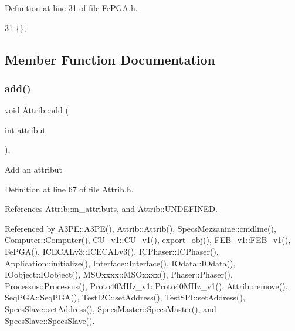 Definition at line 31 of file Fe\+P\+G\+A.\+h.


\begin{DoxyCode}
31 \{\}; 
\end{DoxyCode}


\subsection{Member Function Documentation}
\mbox{\label{classAttrib_a235f773af19c900264a190b00a3b4ad7}} 
\subsubsection{\texorpdfstring{add()}{add()}}
{\footnotesize\ttfamily void Attrib\+::add (\begin{DoxyParamCaption}\item[{int}]{attribut }\end{DoxyParamCaption})\hspace{0.3cm}{\ttfamily [inline]}, {\ttfamily [inherited]}}

Add an attribut 

Definition at line 67 of file Attrib.\+h.



References Attrib\+::m\+\_\+attributs, and Attrib\+::\+U\+N\+D\+E\+F\+I\+N\+ED.



Referenced by A3\+P\+E\+::\+A3\+P\+E(), Attrib\+::\+Attrib(), Specs\+Mezzanine\+::cmdline(), Computer\+::\+Computer(), C\+U\+\_\+v1\+::\+C\+U\+\_\+v1(), export\+\_\+obj(), F\+E\+B\+\_\+v1\+::\+F\+E\+B\+\_\+v1(), Fe\+P\+G\+A(), I\+C\+E\+C\+A\+Lv3\+::\+I\+C\+E\+C\+A\+Lv3(), I\+C\+Phaser\+::\+I\+C\+Phaser(), Application\+::initialize(), Interface\+::\+Interface(), I\+Odata\+::\+I\+Odata(), I\+Oobject\+::\+I\+Oobject(), M\+S\+Oxxxx\+::\+M\+S\+Oxxxx(), Phaser\+::\+Phaser(), Processus\+::\+Processus(), Proto40\+M\+Hz\+\_\+v1\+::\+Proto40\+M\+Hz\+\_\+v1(), Attrib\+::remove(), Seq\+P\+G\+A\+::\+Seq\+P\+G\+A(), Test\+I2\+C\+::set\+Address(), Test\+S\+P\+I\+::set\+Address(), Specs\+Slave\+::set\+Address(), Specs\+Master\+::\+Specs\+Master(), and Specs\+Slave\+::\+Specs\+Slave().


